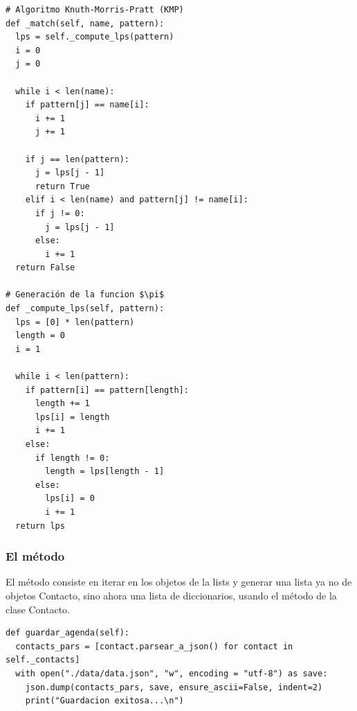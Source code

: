 \begin{verbatim}
# Algoritmo Knuth-Morris-Pratt (KMP)
def _match(self, name, pattern):
  lps = self._compute_lps(pattern)
  i = 0
  j = 0

  while i < len(name):
    if pattern[j] == name[i]:
      i += 1
      j += 1

    if j == len(pattern):
      j = lps[j - 1]
      return True
    elif i < len(name) and pattern[j] != name[i]:
      if j != 0:
        j = lps[j - 1]
      else:
        i += 1
  return False

# Generación de la funcion $\pi$
def _compute_lps(self, pattern):
  lps = [0] * len(pattern)
  length = 0
  i = 1

  while i < len(pattern):
    if pattern[i] == pattern[length]:
      length += 1
      lps[i] = length
      i += 1
    else:
      if length != 0:
        length = lps[length - 1]
      else:
        lps[i] = 0
        i += 1
  return lps
\end{verbatim}

\subsubsection{El método }
El método consiste en iterar en los objetos de la lists  y generar una lista ya no de objetos Contacto, sino ahora una lista de diccionarios, usando el método  de la clase Contacto.

\begin{verbatim}
def guardar_agenda(self):
  contacts_pars = [contact.parsear_a_json() for contact in self._contacts]
  with open("./data/data.json", "w", encoding = "utf-8") as save:
    json.dump(contacts_pars, save, ensure_ascii=False, indent=2)
    print("Guardacion exitosa...\n")
\end{verbatim}
